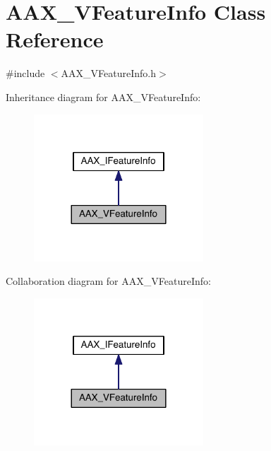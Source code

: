 \hypertarget{a00135}{}\section{A\+A\+X\+\_\+\+V\+Feature\+Info Class Reference}
\label{a00135}


{\ttfamily \#include $<$A\+A\+X\+\_\+\+V\+Feature\+Info.\+h$>$}



Inheritance diagram for A\+A\+X\+\_\+\+V\+Feature\+Info\+:
\nopagebreak
\begin{figure}[H]
\begin{center}
\leavevmode
\includegraphics[width=180pt]{a00701}
\end{center}
\end{figure}


Collaboration diagram for A\+A\+X\+\_\+\+V\+Feature\+Info\+:
\nopagebreak
\begin{figure}[H]
\begin{center}
\leavevmode
\includegraphics[width=180pt]{a00702}
\end{center}
\end{figure}


